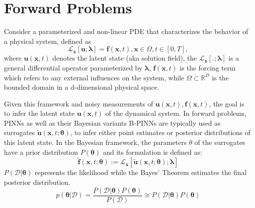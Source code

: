 \documentclass{article}
\begin{document}
\section{Forward Problems}
Consider a parameterized and non-linear PDE that characterizes the behavior of a physical system, defined as 
\begin{equation}
    \mathbf{\mathcal{L}}_{\mathbf{x}}[\mathbf{u};\mathbf{\lambda}] = \mathbf{f} (\mathbf{x},t),  \mathbf{x} \in \Omega,  t \in [0, T],
\end{equation}
where $\mathbf{u}(\mathbf{x},t)$ denotes the latent state (aka solution field), the $\mathbf{\mathcal{L}}_{\mathbf{x}}[.;\mathbf{\lambda}]$ is a general differential operator parameterized by $\mathbf{\lambda}$, $\mathbf{f} (\mathbf{x},t)$ is the forcing term which refers to any external influences on the system, while $\Omega \subset \mathbb{R}^{D}$ is the bounded domain in a d-dimensional physical space.

Given this framework and noisy measurements of $\mathbf{u}(\mathbf{x},t), \mathbf{f} (\mathbf{x},t)$, the goal is to infer the latent state $\mathbf{u}( \mathbf{x},t)$ of the dynamical system. In forward problems, PINNs as well as their Bayesian variants B-PINNs are typically used as surrogates 
$\widetilde{\mathbf{u}}(\mathbf{x}, t; \mathbf{\theta})$, to infer either point estimates or posterior distributions of this latent state. In the Bayesian framework, the parameters $\theta$ of the surrogates have a prior distribution $P(\mathbf{\theta})$ and its formulation is defined as: 
\begin{equation}
    \widetilde{\mathbf{f}}(\mathbf{x}, t; \mathbf{\theta}) := \mathbf{\mathcal{L}}_{\mathbf{x}} [\widetilde{\mathbf{u}}(\mathbf{x}, t; \mathbf{\theta});\mathbf{\lambda}]
\end{equation}
$P(\mathcal{D}|\mathbf{\theta})$ represents the likelihood while the Bayes' Theorem estimates the final posterior distribution. 
\begin{equation}
    p(\mathbf{\theta} | \mathcal{D}) = \frac{P(\mathcal{D}|\mathbf{\theta})P(\mathbf{\theta})}{P(\mathcal{D})} \cong P(\mathcal{D}|\mathbf{\theta})P(\mathbf{\theta})
\end{equation}
\end{document}
